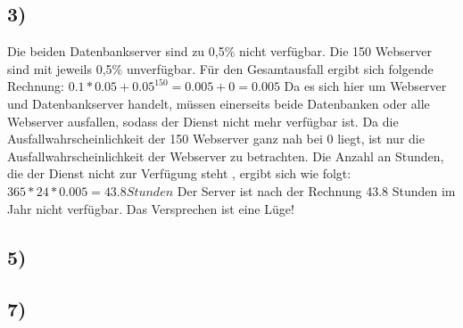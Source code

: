 \documentclass[ngerman]{fbi-aufgabenblatt}
\begin{document}
	\setcounter{section}{0}


	\subsection*{3)}
  Die beiden Datenbankserver sind zu 0,5\% nicht verfügbar. Die 150 Webserver
	sind mit jeweils 0,5\% unverfügbar.
	Für den Gesamtausfall ergibt sich folgende Rechnung: \newline
	$0.1* 0.05 + {0.05}^{150} = 0.005 + 0 = 0.005$ \newline
	Da es sich hier um Webserver und Datenbankserver handelt, müssen einerseits
	beide Datenbanken
	oder alle Webserver ausfallen, sodass der Dienst nicht mehr verfügbar ist.
	Da die Ausfallwahrscheinlichkeit der 150 Webserver ganz nah bei 0 liegt, ist
	nur die Ausfallwahrscheinlichkeit der Webserver zu betrachten.
	\newline
	Die Anzahl an Stunden, die der Dienst nicht zur Verfügung steht , ergibt sich wie folgt: \newline
	$365 * 24 * 0.005 = 43.8 Stunden$ \newline
	Der Server ist nach der Rechnung 43.8 Stunden im Jahr nicht verfügbar.
	Das Versprechen ist eine Lüge!
	
	\subsection*{5)}

	
	\subsection*{7)}
\end{document}
